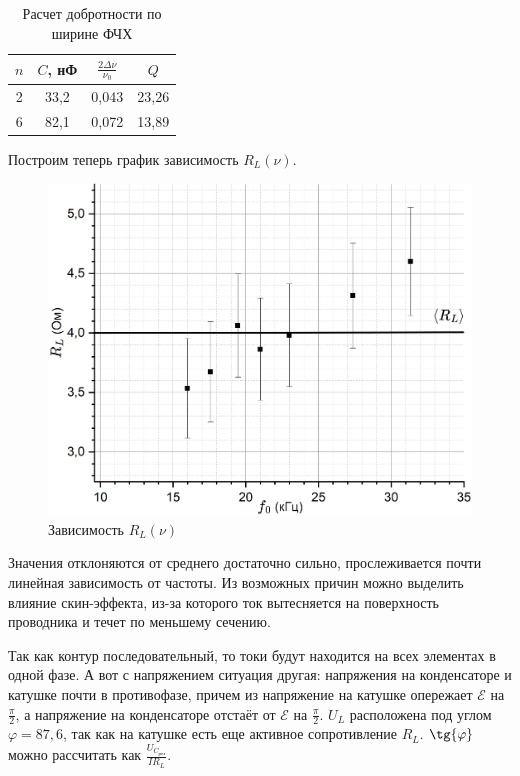 \documentclass[a4paper, 12pt]{article}
\newcommand{\E}{\mathcal{E}}
\begin{document}
	\begin{table}[h]
		\centering
		\begin{tabular}{|c|c|c|c|}
			\hline
			$n$ & $C$, нФ & $\frac{2\Delta \nu}{\nu_0}$ & $Q$ \\ \hline
			2 & 33,2 & 0,043 & 23,26 \\ \hline
			6 & 82,1 & 0,072 & 13,89 \\ \hline
		\end{tabular}
		\caption{Расчет добротности по ширине ФЧХ}
	\end{table}

	Построим теперь график зависимость $R_L(\nu)$.

	\begin{figure}[h]
		\centering
		\includegraphics[width = \textwidth]{LinedR_L}
		\caption{Зависимость $R_L(\nu)$}
	\end{figure}

	Значения отклоняются от среднего достаточно сильно, прослеживается почти линейная зависимость от частоты. Из возможных причин можно выделить влияние скин-эффекта, из-за которого ток вытесняется на поверхность проводника и течет по меньшему сечению.
	\newpage

	Так как контур последовательный, то токи будут находится на всех элементах в одной фазе. А вот с напряжением ситуация другая: напряжения на конденсаторе и катушке почти в противофазе, причем из напряжение на катушке опережает $\E$ на $\frac{\pi}{2}$, а напряжение на конденсаторе отстаёт от $\E$ на $\frac{\pi}{2}$.
	$U_L$ расположена под углом $\varphi = 87,6$\textdegree, так как на катушке есть еще активное сопротивление $R_L$. $\tg{\varphi}$ можно рассчитать как $\frac{U_{C_{\text{рез}}}}{IR_L}$.
\end{document}
